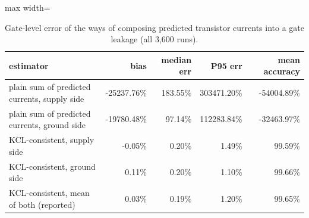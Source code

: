 \begin{table}[H]
\centering
{\small
\begin{adjustbox}{max width=\linewidth}
\begin{tabular}{lrrrr}
\toprule
estimator & bias & median err & P95 err & mean accuracy \\
\midrule
plain sum of predicted currents, supply side & -25237.76\% & 183.55\% & 303471.20\% & -54004.89\% \\
plain sum of predicted currents, ground side & -19780.48\% & 97.14\% & 112283.84\% & -32463.97\% \\
KCL-consistent, supply side & -0.05\% & 0.20\% & 1.49\% & 99.59\% \\
KCL-consistent, ground side & 0.11\% & 0.20\% & 1.10\% & 99.66\% \\
KCL-consistent, mean of both (reported) & 0.03\% & 0.19\% & 1.20\% & 99.65\% \\
\bottomrule
\end{tabular}
\end{adjustbox}
}
\caption{Gate-level error of the ways of composing predicted transistor currents into a gate leakage (all 3{,}600 runs).}
\label{tab:estimators}
\end{table}

